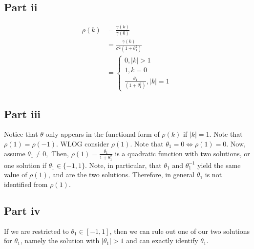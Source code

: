\documentclass[11pt]{article} %
\begin{document}
\subsection{Part ii}
\begin{align*}
\rho(k) &= \frac{\gamma(k)}{\gamma(0)}\\
&= \frac{\gamma(k)}{\sigma^2(1+\theta_1^2)}\\
&= \begin{cases}
0, |k|>1\\
1, k = 0\\
\frac{\theta_1}{(1+\theta_1^2)}, |k| = 1
\end{cases}
\end{align*}
\subsection{Part iii}

Notice that $\theta$ only appears in the functional form of $\rho(k)$ if $|k| = 1$. Note that $\rho(1) = \rho(-1)$. WLOG consider $\rho(1)$. Note that $\theta_1 = 0 \iff \rho(1) = 0$. Now, assume $\theta_1 \neq 0,$ Then, $\rho(1) = \frac{\theta_1}{1+\theta_1^2}$ is a quadratic function with two solutions, or one solution if $\theta_1 \in \{ -1,1 \}$. Note, in particular, that $\theta_1$ and $\theta_1^{-1}$ yield the same value of $\rho(1)$, and are the two solutions. Therefore, in general $\theta_1$ is not identified from $\rho(1).$
%

\subsection{Part iv}

If we are restricted to $\theta_1 \in [-1,1]$, then we can rule out one of our two solutions for $\theta_1$, namely the solution with $|\theta_1|>1$ and can exactly identify $\theta_1$.
\end{document}
